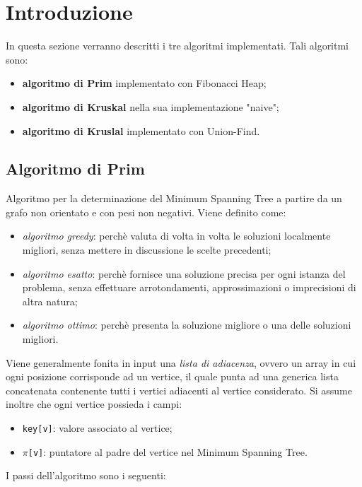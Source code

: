 \section{Introduzione}
In questa sezione verranno descritti i tre algoritmi implementati. Tali algoritmi sono:
\begin{itemize}
	\item \textbf{algoritmo di Prim} implementato con Fibonacci Heap;
	\item \textbf{algoritmo di Kruskal} nella sua implementazione "naive";
	\item \textbf{algoritmo di Kruslal} implementato con Union-Find.
\end{itemize}

\subsection{Algoritmo di Prim}
Algoritmo per la determinazione del Minimum Spanning Tree a partire da un grafo non orientato e con pesi non negativi. Viene definito come:
\begin{itemize}
	\item \textit{algoritmo greedy}: perchè valuta di volta in volta le soluzioni localmente migliori, senza mettere in discussione le scelte precedenti;
	\item \textit{algoritmo esatto}: perchè fornisce una soluzione precisa per ogni istanza del problema, senza effettuare arrotondamenti, approssimazioni o imprecisioni di altra natura;
	\item \textit{algoritmo ottimo}: perchè presenta la soluzione migliore o una delle soluzioni migliori.
\end{itemize}
Viene generalmente fonita in input una \textit{lista di adiacenza}, ovvero un array in cui ogni posizione corrisponde ad un vertice, il quale punta ad una generica lista concatenata contenente tutti i vertici adiacenti al vertice considerato. Si assume inoltre che ogni vertice possieda i campi:
\begin{itemize}
	\item \texttt{key[v]}: valore associato al vertice;
	\item \texttt{$\pi$[v]}: puntatore al padre del vertice nel Minimum Spanning Tree.
\end{itemize}
I passi dell'algoritmo sono i seguenti:
